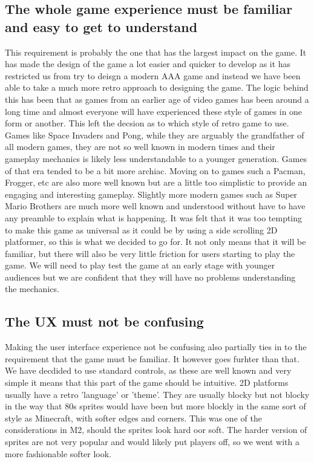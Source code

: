 \documentclass{article}
\begin{document}
\subsection{ The whole game experience must be familiar and easy to get to understand }
This requirement is probably the one that has the largest impact on the game. It has made the design of the game a lot easier and quicker to develop as it has restricted us from try to deisgn a modern AAA game and instead we have been able to take a much more retro approach to designing the game. The logic behind this has been that as games from an earlier age of video games has been around a long time and almost everyone will have experienced these style of games in one form or another. 
This left the decsion as to which style of retro game to use. Games like Space Invaders and Pong, while they are arguably the grandfather of all modern games, they are not so well known in modern times and their gameplay mechanics is likely less understandable to a younger generation. Games of that era tended to be a bit more archiac. 
Moving on to games such a Pacman, Frogger, etc are also more well known but are a little too simplistic to provide an engaging and interesting gameplay.
Slightly more modern games such as Super Mario Brothers are much more well known and understood without have to have any preamble to explain what is happening. It was felt that it was too tempting to make this game as universal as it could be by using a side scrolling 2D platformer, so this is what we decided to go for. It not only means that it will be familiar, but there will also be very little friction for users starting to play the game. We will need to play test the game at an early stage with younger audiences but we are confident that they will have no problems understanding the mechanics.
 
\subsection{ The UX must not be confusing }
Making the user interface experience not be confusing also partially ties in to the requirement that the game must be familiar. It however goes furhter than that. We have decdided to use standard controls, as these are well known and very simple it means that this part of the game should be intuitive.
2D platforms usually have a retro 'language' or 'theme'. They are usually blocky but not blocky in the way that 80s sprites would have been but more blockly in the same sort of style as Minecraft, with softer edges and corners. This was one of the considerations in M2, should the sprites look hard oor soft. The harder version of sprites are not very popular and would likely put players off, so we went with a more fashionable softer look.
\end{document}

